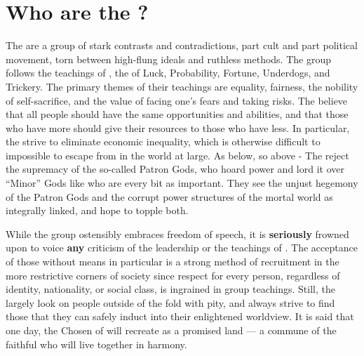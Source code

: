 \documentclass[blue]{GL2020}
\begin{document}
\name{\bCult{}}

\section*{Who are the \pGoaties{}?}
The \pGoaties{} are a group of stark contrasts and contradictions, part cult and part political movement, torn between high-flung ideals and ruthless methods. The group follows the teachings of \cGenesis{}, the \cGenesis{\Deity} of Luck, Probability, Fortune, Underdogs, and Trickery. The primary themes of their teachings are equality, fairness, the nobility of self-sacrifice, and the value of facing one's fears and taking risks. The \pGoaties{} believe that all people should have the same opportunities and abilities, and that those who have more should give their resources to those who have less. In particular, the \pGoaties{} strive to eliminate economic inequality, which is otherwise difficult to impossible to escape from in the world at large. As below, so above - The \pGoaties{} reject the supremacy of the so-called Patron Gods, who hoard power and lord it over “Minor” Gods like \cGenesis{} who are every bit as important. They see the unjust hegemony of the Patron Gods and the corrupt power structures of the mortal world as integrally linked, and hope to topple both.

While the group ostensibly embraces freedom of speech, it is \textbf{seriously} frowned upon to voice \textbf{any} criticism of the leadership or the teachings of \cGenesis{}. The acceptance of those without means in particular is a strong method of recruitment in the more restrictive corners of society since respect for every person, regardless of identity, nationality, or social class, is ingrained in group teachings. Still, the \pGoaties{} largely look on people outside of the fold with pity, and always strive to find those that they can safely induct into their enlightened worldview. It is said that one day, the Chosen of \cGenesis{} will recreate \pEarth{} as a promised land — a commune of the faithful who will live together in harmony.
\end{document}
